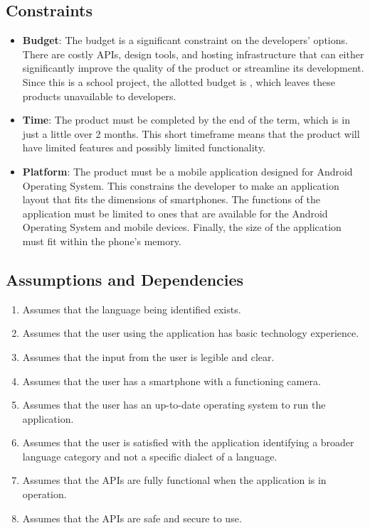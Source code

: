 
\subsection{Constraints}
\label{sub:constraints}
\begin{itemize}
	\item \textbf{Budget}: The budget is a significant constraint on the developers' options. There are costly APIs, design tools, and hosting infrastructure that can either significantly improve the quality of the product or streamline its development. Since this is a school project, the allotted budget is , which leaves these products unavailable to developers.
	\item \textbf{Time}: The product must be completed by the end of the term, which is in just a little over 2 months. This short timeframe means that the product will have limited features and possibly limited functionality.
	\item \textbf{Platform}: The product must be a mobile application designed for Android Operating System. This constrains the developer to make an application layout that fits the dimensions of smartphones. The functions of the application must be limited to ones that are available for the Android Operating System and mobile devices. Finally, the size of the application must fit within the phone's memory.
\end{itemize}


\subsection{Assumptions and Dependencies}
\label{sub:assumptions_and_dependencies}
\begin{enumerate}[1.]
	\item Assumes that the language being identified exists.
	\item Assumes that the user using the application has basic technology experience.
	\item Assumes that the input from the user is legible and clear.
	\item Assumes that the user has a smartphone with a functioning camera.
	\item Assumes that the user has an up-to-date operating system to run the application.
	\item Assumes that the user is satisfied with the application identifying a broader language category and not a specific dialect of a language.
	\item Assumes that the APIs are fully functional when the application is in operation.
	\item Assumes that the APIs are safe and secure to use.
\end{enumerate}




